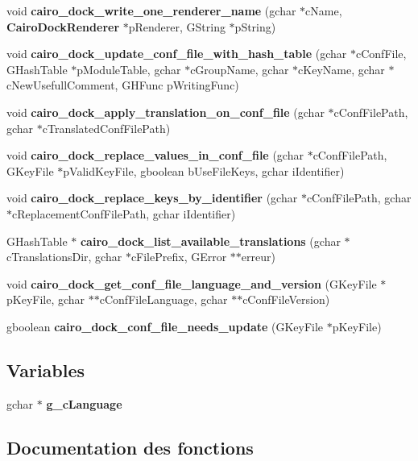 \begin{CompactItemize}
void {\bf cairo\_\-dock\_\-write\_\-one\_\-renderer\_\-name} (gchar $\ast$c\-Name, {\bf Cairo\-Dock\-Renderer} $\ast$p\-Renderer, GString $\ast$p\-String)
\item 
void {\bf cairo\_\-dock\_\-update\_\-conf\_\-file\_\-with\_\-hash\_\-table} (gchar $\ast$c\-Conf\-File, GHash\-Table $\ast$p\-Module\-Table, gchar $\ast$c\-Group\-Name, gchar $\ast$c\-Key\-Name, gchar $\ast$c\-New\-Usefull\-Comment, GHFunc p\-Writing\-Func)
\item 
void {\bf cairo\_\-dock\_\-apply\_\-translation\_\-on\_\-conf\_\-file} (gchar $\ast$c\-Conf\-File\-Path, gchar $\ast$c\-Translated\-Conf\-File\-Path)
\item 
void {\bf cairo\_\-dock\_\-replace\_\-values\_\-in\_\-conf\_\-file} (gchar $\ast$c\-Conf\-File\-Path, GKey\-File $\ast$p\-Valid\-Key\-File, gboolean b\-Use\-File\-Keys, gchar i\-Identifier)
\item 
void {\bf cairo\_\-dock\_\-replace\_\-keys\_\-by\_\-identifier} (gchar $\ast$c\-Conf\-File\-Path, gchar $\ast$c\-Replacement\-Conf\-File\-Path, gchar i\-Identifier)
\item 
GHash\-Table $\ast$ {\bf cairo\_\-dock\_\-list\_\-available\_\-translations} (gchar $\ast$c\-Translations\-Dir, gchar $\ast$c\-File\-Prefix, GError $\ast$$\ast$erreur)
\item 
void {\bf cairo\_\-dock\_\-get\_\-conf\_\-file\_\-language\_\-and\_\-version} (GKey\-File $\ast$p\-Key\-File, gchar $\ast$$\ast$c\-Conf\-File\-Language, gchar $\ast$$\ast$c\-Conf\-File\-Version)
\item 
gboolean {\bf cairo\_\-dock\_\-conf\_\-file\_\-needs\_\-update} (GKey\-File $\ast$p\-Key\-File)
\end{CompactItemize}
\subsection*{Variables}
\begin{CompactItemize}
\item 
gchar $\ast$ {\bf g\_\-c\-Language}
\end{CompactItemize}


\subsection{Documentation des fonctions}
